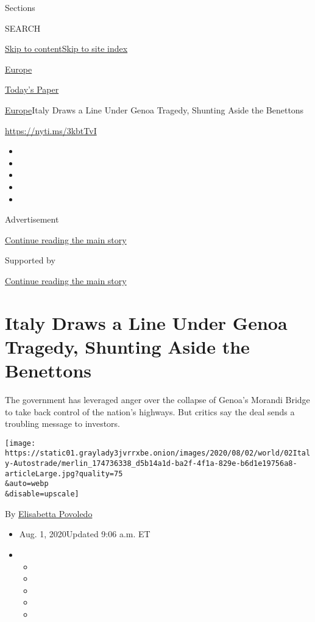 Sections

SEARCH

\protect\hyperlink{site-content}{Skip to
content}\protect\hyperlink{site-index}{Skip to site index}

\href{https://www.nytimes3xbfgragh.onion/section/world/europe}{Europe}

\href{https://myaccount.nytimes3xbfgragh.onion/auth/login?response_type=cookie\&client_id=vi}{}

\href{https://www.nytimes3xbfgragh.onion/section/todayspaper}{Today's
Paper}

\href{/section/world/europe}{Europe}\textbar{}Italy Draws a Line Under
Genoa Tragedy, Shunting Aside the Benettons

\url{https://nyti.ms/3kbtTvI}

\begin{itemize}
\item
\item
\item
\item
\item
\end{itemize}

Advertisement

\protect\hyperlink{after-top}{Continue reading the main story}

Supported by

\protect\hyperlink{after-sponsor}{Continue reading the main story}

\hypertarget{italy-draws-a-line-under-genoa-tragedy-shunting-aside-the-benettons}{%
\section{Italy Draws a Line Under Genoa Tragedy, Shunting Aside the
Benettons}\label{italy-draws-a-line-under-genoa-tragedy-shunting-aside-the-benettons}}

The government has leveraged anger over the collapse of Genoa's Morandi
Bridge to take back control of the nation's highways. But critics say
the deal sends a troubling message to investors.

\texttt{[image: https://static01.graylady3jvrrxbe.onion/images/2020/08/02/world/02Italy-Autostrade/merlin\_174736338\_d5b14a1d-ba2f-4f1a-829e-b6d1e19756a8-articleLarge.jpg?quality=75\\\&auto=webp\\\&disable=upscale]}

By
\href{https://www.nytimes3xbfgragh.onion/by/elisabetta-povoledo}{Elisabetta
Povoledo}

\begin{itemize}
\item
  Aug. 1, 2020Updated 9:06 a.m. ET
\item
  \begin{itemize}
  \item
  \item
  \item
  \item
  \item
  \end{itemize}
\end{itemize}

